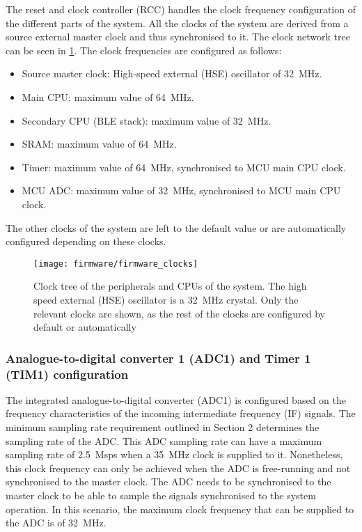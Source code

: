 The reset and clock controller (RCC) handles the clock frequency configuration of the different parts of the system. All the clocks of the system are derived from a source external master clock and thus synchronised to it. The clock network tree can be seen in \cref{fig:firmware_clock_tree}. The clock frequencies are configured as follows:
\begin{itemize}
	\item Source master clock: High-speed external (HSE) oscillator of \SI{32}{\mega\hertz}.
	\item Main CPU: maximum value of \SI{64}{\mega\hertz}.
	\item Secondary CPU (BLE stack): maximum value of \SI{32}{\mega\hertz}.
	\item SRAM: maximum value of \SI{64}{\mega\hertz}.
	\item Timer: maximum value of \SI{64}{\mega\hertz}, synchronised to MCU main CPU clock.
	\item MCU ADC: maximum value of \SI{32}{\mega\hertz}, synchronised to MCU main CPU clock.
\end{itemize}

The other clocks of the system are left to the default value or are automatically configured depending on these clocks.

\begin{figure}[ht]
	\centering
	\texttt{[image: firmware/firmware\_clocks]}
	\caption{Clock tree of the peripherals and CPUs of the system. The high speed external (HSE) oscillator is a \SI{32}{\mega\hertz} crystal. Only the relevant clocks are shown, as the rest of the clocks are configured by default or automatically}
	\label{fig:firmware_clock_tree}
\end{figure}

\subsubsection{Analogue-to-digital converter 1 (ADC1) and Timer 1 (TIM1) configuration} \label{sec:adc_tim_config_v_vector}

The integrated analogue-to-digital converter (ADC1) is configured based on the frequency characteristics of the incoming intermediate frequency (IF) signals. The minimum sampling rate requirement outlined in Section 2 determines the sampling rate of the ADC. This ADC sampling rate can have a maximum sampling rate of \SI{2.5}{Msps} when a \SI{35}{\mega\hertz} clock is supplied to it. Nonetheless, this clock frequency can only be achieved when the ADC is free-running and not synchronised to the master clock. The ADC needs to be synchronised to the master clock to be able to sample the signals synchronised to the system operation. In this scenario, the maximum clock frequency that can be supplied to the ADC is of \SI{32}{\mega\hertz}.

